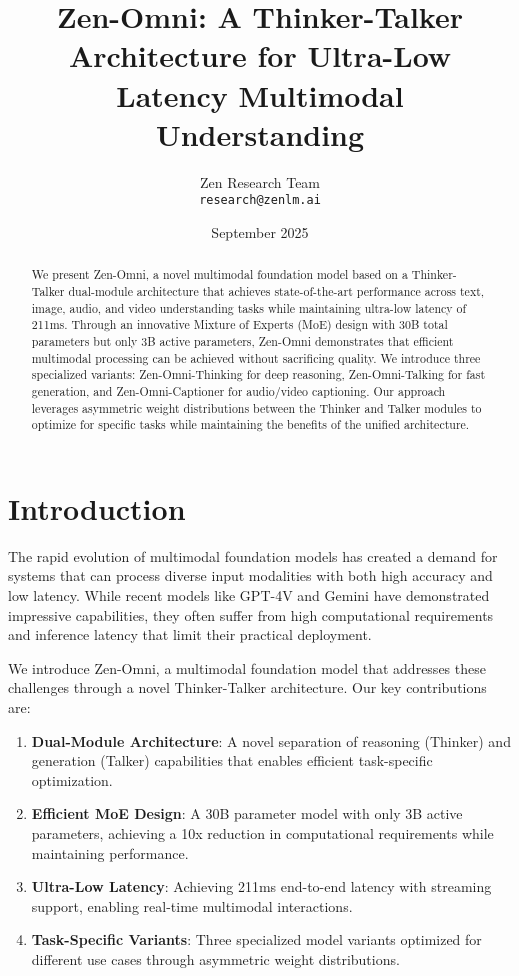 \documentclass{article}
\title{Zen-Omni: A Thinker-Talker Architecture for Ultra-Low Latency Multimodal Understanding}
\author{
    Zen Research Team\\
    \texttt{research@zenlm.ai}
}
\date{September 2025}
\begin{document}
\maketitle

\begin{abstract}
We present Zen-Omni, a novel multimodal foundation model based on a Thinker-Talker dual-module architecture that achieves state-of-the-art performance across text, image, audio, and video understanding tasks while maintaining ultra-low latency of 211ms. Through an innovative Mixture of Experts (MoE) design with 30B total parameters but only 3B active parameters, Zen-Omni demonstrates that efficient multimodal processing can be achieved without sacrificing quality. We introduce three specialized variants: Zen-Omni-Thinking for deep reasoning, Zen-Omni-Talking for fast generation, and Zen-Omni-Captioner for audio/video captioning. Our approach leverages asymmetric weight distributions between the Thinker and Talker modules to optimize for specific tasks while maintaining the benefits of the unified architecture.
\end{abstract}

\section{Introduction}

The rapid evolution of multimodal foundation models has created a demand for systems that can process diverse input modalities with both high accuracy and low latency. While recent models like GPT-4V \cite{gpt4v} and Gemini \cite{gemini} have demonstrated impressive capabilities, they often suffer from high computational requirements and inference latency that limit their practical deployment.

We introduce Zen-Omni, a multimodal foundation model that addresses these challenges through a novel Thinker-Talker architecture. Our key contributions are:

\begin{enumerate}
    \item \textbf{Dual-Module Architecture}: A novel separation of reasoning (Thinker) and generation (Talker) capabilities that enables efficient task-specific optimization.

    \item \textbf{Efficient MoE Design}: A 30B parameter model with only 3B active parameters, achieving a 10x reduction in computational requirements while maintaining performance.

    \item \textbf{Ultra-Low Latency}: Achieving 211ms end-to-end latency with streaming support, enabling real-time multimodal interactions.

    \item \textbf{Task-Specific Variants}: Three specialized model variants optimized for different use cases through asymmetric weight distributions.
\end{enumerate}
\end{document}
